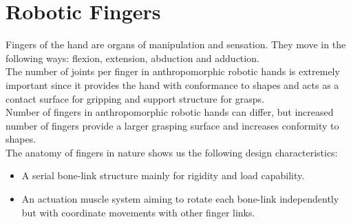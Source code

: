 \documentclass[a4paper, 10pt, conference]{ieeeconf}      %
\begin{document}
\section{\textbf{Robotic Fingers}}
Fingers of the hand are organs of manipulation and sensation. They move in the following ways: flexion, extension, abduction and adduction.\\
The number of joints per finger in anthropomorphic robotic hands is extremely important since it provides the hand with conformance to shapes and acts as a contact surface for gripping and support structure for grasps.\\
Number of fingers in anthropomorphic robotic hands can differ, but increased number of fingers provide a larger grasping surface and increases conformity to shapes.\\
The anatomy of fingers in nature shows us the following design characteristics:\\
\begin{itemize}
	\item A serial bone-link structure mainly for rigidity and load capability.
	\item An actuation muscle system aiming to rotate each bone-link independently but with coordinate movements with other finger links.\\
\end{itemize}
\end{document}
